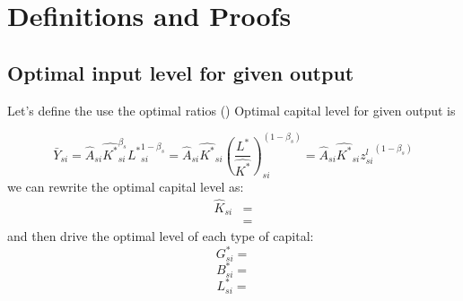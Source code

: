 \documentclass[11pt]{article}
\newtheorem{proposition}{PROPOSITION}
\begin{document}





\appendix

\section{Definitions and Proofs} \label{Ap:defProof}
\subsection{Optimal input level for given output} \label{Ap:optimal level for given output}


Let's define the use the optimal ratios ()
Optimal capital level for given output is 

\begin{equation*}
  \bar{Y}_{si} = \hat{A}_{si} \hat{K^*}_{si}^{\beta_s} {L^*}_{si}^{1-\beta_s} = \hat{A}_{si} \hat{K^*}_{si} ({\frac{L^*}{\hat{K^*}}})_{si}^{(1-\beta_s)}= \hat{A}_{si} \hat{K^*}_{si} {z_{si}^l}^{(1-\beta_s)}
\end{equation*}
we can rewrite the optimal capital level as:
\begin{equation*}
  \begin{split}
      \hat{K}_{si} &= \\
      & = 
  \end{split}
\end{equation*}
and then drive the optimal level of each type of capital:
\begin{equation*}
  G_{si}^* = 
\end{equation*}
\begin{equation*}
  B_{si}^* = 
\end{equation*}
\begin{equation*}
  L_{si}^* = 
\end{equation*}
\end{document}
